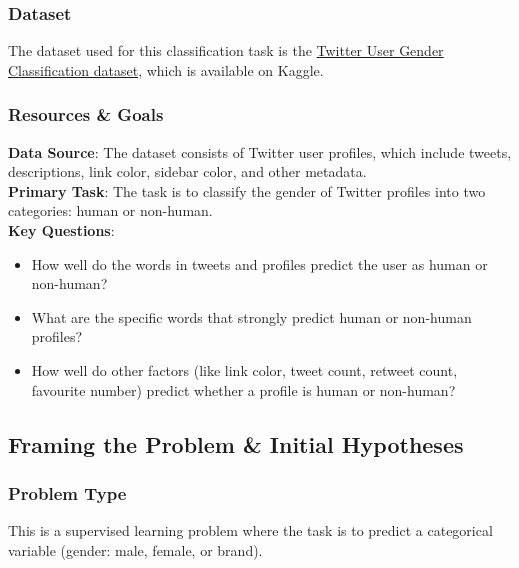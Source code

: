 \documentclass[a4paper,11pt]{article}
\begin{document}
\subsubsection*{Dataset}
The dataset used for this classification task is the \href{https://www.kaggle.com/datasets/crowdflower/twitter-user-gender-classification}{Twitter User Gender Classification dataset}, which is available on Kaggle.

\subsubsection*{Resources \& Goals}
\textbf{Data Source}: The dataset consists of Twitter user profiles, which include tweets, descriptions, link color, sidebar color, and other metadata. \\
\textbf{Primary Task}: The task is to classify the gender of Twitter profiles into two categories: human or non-human. \\
\textbf{Key Questions}:
\begin{itemize}
    \item How well do the words in tweets and profiles predict the user as human or non-human?
    \item What are the specific words that strongly predict human or non-human profiles?
    \item How well do other factors (like link color, tweet count, retweet count, favourite number) predict whether a profile is human or non-human?
\end{itemize}

\subsection{Framing the Problem \& Initial Hypotheses}
\subsubsection*{Problem Type}
This is a supervised learning problem where the task is to predict a categorical variable (gender: male, female, or brand).
\end{document}
